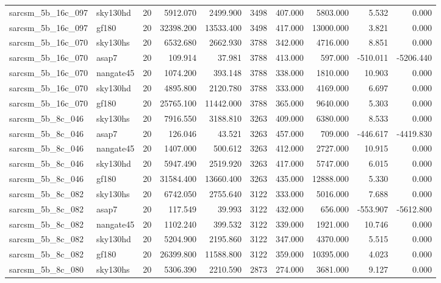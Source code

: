 \begin{longtable}{llrrrrrrrr}
sarcsm\_5b\_16c\_097 & sky130hd & 20 & 5912.070 & 2499.900 & 3498 & 407.000 & 5803.000 & 5.532 & 0.000 \\
sarcsm\_5b\_16c\_097 & gf180 & 20 & 32398.200 & 13533.400 & 3498 & 417.000 & 13000.000 & 3.821 & 0.000 \\
sarcsm\_5b\_16c\_070 & sky130hs & 20 & 6532.680 & 2662.930 & 3788 & 342.000 & 4716.000 & 8.851 & 0.000 \\
sarcsm\_5b\_16c\_070 & asap7 & 20 & 109.914 & 37.981 & 3788 & 413.000 & 597.000 & -510.011 & -5206.440 \\
sarcsm\_5b\_16c\_070 & nangate45 & 20 & 1074.200 & 393.148 & 3788 & 338.000 & 1810.000 & 10.903 & 0.000 \\
sarcsm\_5b\_16c\_070 & sky130hd & 20 & 4895.800 & 2120.780 & 3788 & 333.000 & 4169.000 & 6.697 & 0.000 \\
sarcsm\_5b\_16c\_070 & gf180 & 20 & 25765.100 & 11442.000 & 3788 & 365.000 & 9640.000 & 5.303 & 0.000 \\
sarcsm\_5b\_8c\_046 & sky130hs & 20 & 7916.550 & 3188.810 & 3263 & 409.000 & 6380.000 & 8.533 & 0.000 \\
sarcsm\_5b\_8c\_046 & asap7 & 20 & 126.046 & 43.521 & 3263 & 457.000 & 709.000 & -446.617 & -4419.830 \\
sarcsm\_5b\_8c\_046 & nangate45 & 20 & 1407.000 & 500.612 & 3263 & 412.000 & 2727.000 & 10.915 & 0.000 \\
sarcsm\_5b\_8c\_046 & sky130hd & 20 & 5947.490 & 2519.920 & 3263 & 417.000 & 5747.000 & 6.015 & 0.000 \\
sarcsm\_5b\_8c\_046 & gf180 & 20 & 31584.400 & 13660.400 & 3263 & 435.000 & 12888.000 & 5.330 & 0.000 \\
sarcsm\_5b\_8c\_082 & sky130hs & 20 & 6742.050 & 2755.640 & 3122 & 333.000 & 5016.000 & 7.688 & 0.000 \\
sarcsm\_5b\_8c\_082 & asap7 & 20 & 117.549 & 39.993 & 3122 & 432.000 & 656.000 & -553.907 & -5612.800 \\
sarcsm\_5b\_8c\_082 & nangate45 & 20 & 1102.240 & 399.532 & 3122 & 339.000 & 1921.000 & 10.746 & 0.000 \\
sarcsm\_5b\_8c\_082 & sky130hd & 20 & 5204.900 & 2195.860 & 3122 & 347.000 & 4370.000 & 5.515 & 0.000 \\
sarcsm\_5b\_8c\_082 & gf180 & 20 & 26399.800 & 11588.800 & 3122 & 359.000 & 10395.000 & 4.023 & 0.000 \\
sarcsm\_5b\_8c\_080 & sky130hs & 20 & 5306.390 & 2210.590 & 2873 & 274.000 & 3681.000 & 9.127 & 0.000 \\

\end{longtable}
